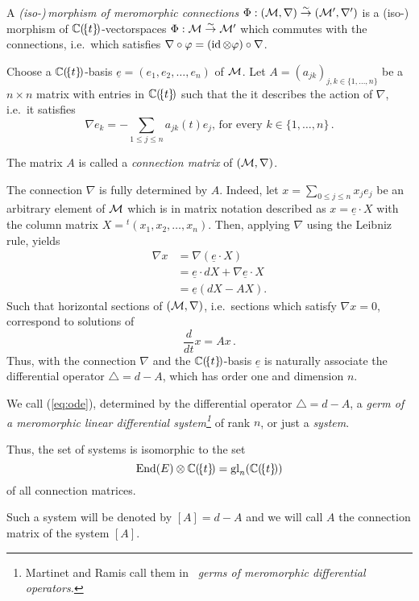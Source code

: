 \begin{defn}
  A \emph{(iso-)\,morphism of meromorphic connections}
  $\Phi:(\mathcal{M},\nabla)\overset{\sim}\to(\mathcal{M}',\nabla')$ is a (iso-)\,morphism of
  $\mathbb{C}(\!\{t\}\!)$-vectorspaces $\Phi:\mathcal{M}\overset{\sim}\to\mathcal{M}'$ which commutes
  with the connections, i.e.\ which satisfies
  $\nabla\circ\varphi = (\operatorname{id}\otimes\varphi)\circ\nabla$.
\end{defn}
Choose a $\mathbb{C}(\!\{t\}\!)$-basis $\underline{e}=(e_1,e_2,\dots,e_n)$ of $\mathcal{M}$.
Let $A=(a_{jk})_{j,k\in\{1,\dots,n\}}$ be a $n\times n$ matrix with entries in
$\mathbb{C}(\!\{t\}\!)$ such that the it describes the action of $\nabla$, i.e.\ it
satisfies
\[
  \nabla e_k
  =
  -\sum_{1\leq j\leq n} a_{jk}(t)e_j \text{, for every $k\in\{1,\dots,n\}$}\,.
\]
\begin{defn}
  The matrix $A$ is called a \emph{connection matrix} of $(\mathcal{M},\nabla)$.
\end{defn}
The connection $\nabla$ is fully determined by $A$. Indeed, let
$x=\sum_{0\leq j\leq n}x_je_j$ be an arbitrary element of $\mathcal{M}$ which is in
matrix notation described as $x=\underline{e}\cdot X$ with the column matrix
$X={}^t\!(x_1,x_2 ,\dots,x_n)$.
Then, applying $\nabla$ using the Leibniz rule, yields
\begin{align*}
  \nabla x&=\nabla\left(\underline{e}\cdot X\right)
  \\&=\underline{e} \cdot dX + \nabla \underline{e} \cdot X
  \\&=\underline{e}\left(dX-AX\right).
\end{align*}
Such that horizontal sections of $(\mathcal{M},\nabla)$, i.e.\ sections which satisfy
$\nabla x=0$, correspond to solutions of
\begin{equation}\label{eq:ode}
  \frac{d}{dt}x=Ax \,.
\end{equation}
Thus, with the connection $\nabla$ and the $\mathbb{C}(\!\{t\}\!)$-basis
$\underline{e}$ is naturally associate the differential operator
$\triangle=d-A$, which has order one and dimension $n$.
\begin{defn}
  We call (\ref{eq:ode}), determined by the differential operator
  $\triangle=d-A$, a \emph{germ of a meromorphic linear differential
  system\footnote{Martinet and Ramis call them in~\cite{Martinet1991}
  \emph{germs of meromorphic differential operators.}}} of rank $n$, or just a
  \emph{system}.
  \begin{s-prop}
    Thus, the set of systems is isomorphic to the set
    \[
      \operatorname{End}(E)\otimes\mathbb{C}(\!\{t\}\!)=\operatorname{gl}_n(\mathbb{C}(\!\{t\}\!))
    \]
    of all connection matrices.
  \end{s-prop}
  Such a system will be denoted by $[A]=d-A$ and we will call $A$ the
  connection matrix of the system $[A]$.
\end{defn}
